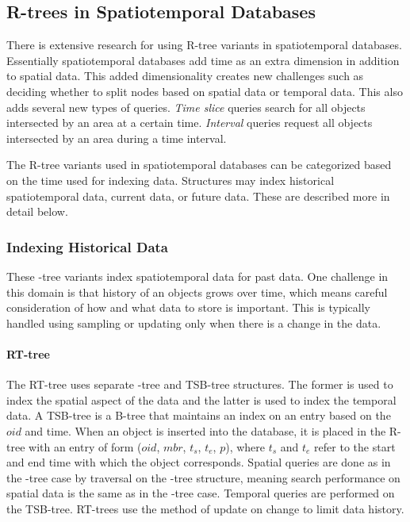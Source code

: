 \subsection{R-trees in Spatiotemporal Databases}
There is extensive research for using R-tree variants in spatiotemporal
databases. Essentially spatiotemporal databases add time as an extra dimension
in addition to spatial data. This added dimensionality creates new challenges
such as deciding whether to split nodes based on spatial data or temporal data. 
This also adds several new types of queries. \emph{Time slice}
queries search for all objects intersected by an area at a certain time. 
\emph{Interval} queries request all objects intersected by an area during a time
interval.

The R-tree variants used in spatiotemporal databases can be categorized based
on the time used for indexing data. Structures may index historical 
spatiotemporal data, current data, or future data. These are described more
in detail below.

\subsubsection{Indexing Historical Data}
These \rbase-tree variants index spatiotemporal data for past data. One challenge
in this domain is that history of an objects grows over time, which means 
careful consideration of how and what data to store is important. This is 
typically handled using sampling or updating only when there is a change in the
data. 

\paragraph{RT-tree} The RT-tree\cite{xu1990rt} uses separate \rbase-tree and 
TSB-tree structures. The former is used 
to index the spatial aspect of the data and the latter is used to index
the temporal data. A TSB-tree is a B-tree that maintains an index on an 
entry based on the $oid$ and time. When an object is inserted into the 
database, it is placed in the R-tree with an entry of form 
($oid$, $mbr$, $t_s$, $t_e$, $p$), where $t_s$ and $t_e$ refer to the 
start and end time with which the object corresponds. Spatial queries 
are done as in the \rbase-tree case by traversal on the \rbase-tree 
structure, meaning search performance on spatial data is the same as in 
the \rbase-tree case. Temporal queries are performed on the TSB-tree. 
RT-trees use the method of update on change to limit data history.

